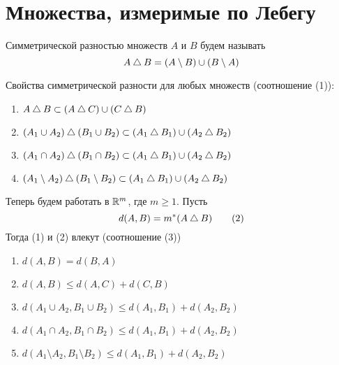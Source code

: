 \documentclass[main]{subfiles}
\begin{document}
\section{Множества, измеримые по Лебегу}
\begin{definition}
    Симметрической разностью множеств $A$ и $B$ будем называть
    \[A \mathbin{\triangle} B = (A \setminus B) \cup (B \setminus A)\]
\end{definition}
Свойства симметрической разности для любых множеств (соотношение (1)):
\begin{enumerate}
    \item $A \mathbin{\triangle} B \subset (A \mathbin{\triangle} C) \cup (C \mathbin{\triangle} B)$
    \item $(A_1 \cup A_2) \mathbin{\triangle} (B_1 \cup B_2) \subset (A_1 \mathbin{\triangle} B_1) \cup (A_2 \mathbin{\triangle} B_2)$
    \item $(A_1 \cap A_2) \mathbin{\triangle} (B_1 \cap B_2) \subset (A_1 \mathbin{\triangle} B_1) \cup (A_2 \mathbin{\triangle} B_2)$
    \item $(A_1 \setminus A_2) \mathbin{\triangle} (B_1 \setminus B_2) \subset (A_1 \mathbin{\triangle} B_1) \cup (A_2 \mathbin{\triangle} B_2)$
\end{enumerate}

Теперь будем работать в $\mathbb{R}^m$, где $m \ge 1$.
Пусть
\[d(A, B) = m^*(A \mathbin{\triangle} B) \tag{2}\]
Тогда (1) и (2) влекут (соотношение (3))
\begin{enumerate}
    \item $d(A, B) = d(B, A)$
    \item $d(A, B) \le d(A, C) + d(C, B)$
    \item $d(A_1 \cup A_2, B_1 \cup B_2) \le d(A_1, B_1) + d(A_2, B_2)$
    \item $d(A_1 \cap A_2, B_1 \cap B_2) \le d(A_1, B_1) + d(A_2, B_2)$
    \item $d(A_1 \setminus A_2, B_1 \setminus B_2) \le d(A_1, B_1) + d(A_2, B_2)$
\end{enumerate}
\end{document}
